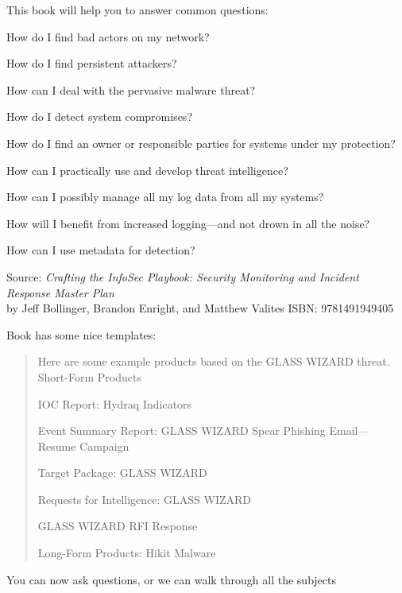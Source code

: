 \documentclass[Screen16to9,17pt]{foils}
\begin{document}


This book will help you to answer common questions:
\begin{list2}
\item How do I find bad actors on my network?
\item How do I find persistent attackers?
\item How can I deal with the pervasive malware threat?
\item How do I detect system compromises?
\item How do I find an owner or responsible parties for systems under my protection?
\item How can I practically use and develop threat intelligence?
\item How can I possibly manage all my log data from all my systems?
\item How will I benefit from increased logging—and not drown in all the noise?
\item How can I use metadata for detection?
\end{list2}
Source: \emph{Crafting the InfoSec Playbook: Security Monitoring and Incident Response Master Plan}\\
 by Jeff Bollinger, Brandon Enright, and Matthew Valites ISBN: 9781491949405



Book has some nice templates:
\begin{quote}
Here are some example products based on the GLASS WIZARD threat.
Short-Form Products
\begin{list2}
\item IOC Report: Hydraq Indicators
\item Event Summary Report: GLASS WIZARD Spear Phishing Email—
Resume Campaign
\item Target Package: GLASS WIZARD
\item Requests for Intelligence: GLASS WIZARD
\item GLASS WIZARD RFI Response
\end{list2}

Long-Form Products: Hikit Malware
\end{quote}



You can now ask questions, or we can walk through all the subjects
\end{document}
